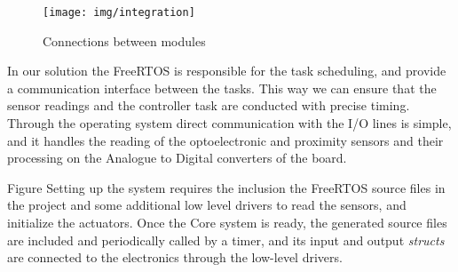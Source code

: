 \begin{figure}[H]
    \centering
    \texttt{[image: img/integration]}
    \caption{Connections between modules}
    \label{fig:integration}
\end{figure}

In our solution the FreeRTOS is responsible for the task scheduling, and provide a communication interface between the tasks. This way we can ensure that the sensor readings and the controller task are conducted with precise timing. Through the operating system direct communication with the I/O lines is simple, and it handles the reading of the optoelectronic and proximity sensors and their processing on the Analogue to Digital converters of the board.

Figure Setting up the system requires the inclusion the FreeRTOS source files in the project and some additional low level drivers to read the sensors, and initialize the actuators. Once the Core system is ready, the generated source files are included and periodically called by a timer, and its input and output \emph{structs} are connected to the electronics through the low-level drivers.